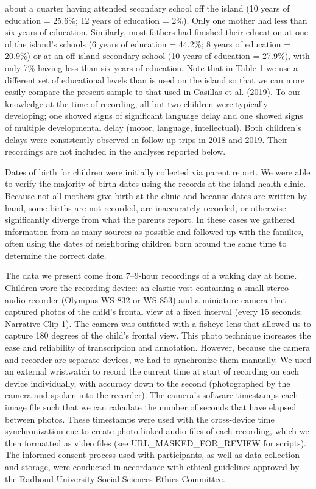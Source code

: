 \documentclass[,man,floatsintext]{apa6}
\begin{document}
about a quarter having attended secondary school off the island (10
years of education = 25.6\%; 12 years of education = 2\%). Only one
mother had less than six years of education. Similarly, most fathers had
finished their education at one of the island's schools (6 years of
education = 44.2\%; 8 years of education = 20.9\%) or at an off-island
secondary school (10 years of education = 27.9\%), with only 7\% having
less than six years of education. Note that in
\protect\hyperlink{tab1}{Table 1} we use a different set of educational
levels than is used on the island so that we can more easily compare the
present sample to that used in Casillas et al. (2019). To our knowledge
at the time of recording, all but two children were typically
developing; one showed signs of significant language delay and one
showed signs of multiple developmental delay (motor, language,
intellectual). Both children's delays were consistently observed in
follow-up trips in 2018 and 2019. Their recordings are not included in
the analyses reported below.

Dates of birth for children were initially collected via parent report.
We were able to verify the majority of birth dates using the records at
the island health clinic. Because not all mothers give birth at the
clinic and because dates are written by hand, some births are not
recorded, are inaccurately recorded, or otherwise significantly diverge
from what the parents report. In these cases we gathered information
from as many sources as possible and followed up with the families,
often using the dates of neighboring children born around the same time
to determine the correct date.

The data we present come from 7--9-hour recordings of a waking day at
home. Children wore the recording device: an elastic vest containing a
small stereo audio recorder (Olympus WS-832 or WS-853) and a miniature
camera that captured photos of the child's frontal view at a fixed
interval (every 15 seconds; Narrative Clip 1). The camera was outfitted
with a fisheye lens that allowed us to capture 180 degrees of the
child's frontal view. This photo technique increases the ease and
reliability of transcription and annotation. However, because the camera
and recorder are separate devices, we had to synchronize them manually.
We used an external wristwatch to record the current time at start of
recording on each device individually, with accuracy down to the second
(photographed by the camera and spoken into the recorder). The camera's
software timestamps each image file such that we can calculate the
number of seconds that have elapsed between photos. These timestamps
were used with the cross-device time synchronization cue to create
photo-linked audio files of each recording, which we then formatted as
video files (see URL\_MASKED\_FOR\_REVIEW for scripts). The informed
consent process used with participants, as well as data collection and
storage, were conducted in accordance with ethical guidelines approved
by the Radboud University Social Sciences Ethics Committee.
\end{document}
